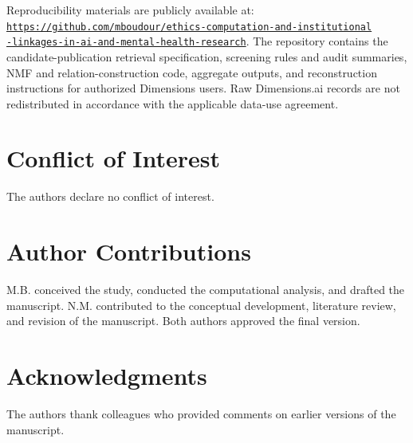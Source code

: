 \documentclass[12pt]{article}
\begin{document}
Reproducibility materials are publicly available at:
\noindent\href{https://github.com/mboudour/ethics-computation-and-institutional-linkages-in-ai-and-mental-health-research}{\texttt{https://github.com/mboudour/ethics-computation-and-institutional}}\\
\href{https://github.com/mboudour/ethics-computation-and-institutional-linkages-in-ai-and-mental-health-research}{\texttt{-linkages-in-ai-and-mental-health-research}}.
The repository contains the candidate-publication retrieval specification, screening rules and audit summaries, NMF and relation-construction code, aggregate outputs, and reconstruction instructions for authorized Dimensions users. Raw Dimensions.ai records are not redistributed in accordance with the applicable data-use agreement.

\section*{Conflict of Interest}
The authors declare no conflict of interest.

\section*{Author Contributions}
M.B. conceived the study, conducted the computational analysis, and drafted the manuscript. N.M. contributed to the conceptual development, literature review, and revision of the manuscript. Both authors approved the final version.

\section*{Acknowledgments}
The authors thank colleagues who provided comments on earlier versions of the manuscript.



\end{document}
